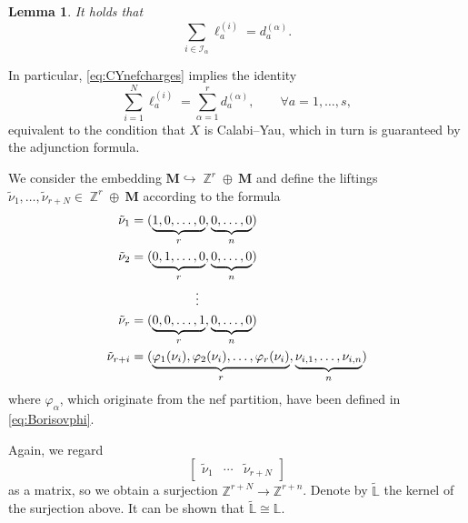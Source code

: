 \documentclass[12pt,a4paper,oneside]{amsart}
\numberwithin{equation}{section}
\newtheorem{lem}[thm]{Lemma}
\theoremstyle{definition}
\theoremstyle{remark}
\DeclareMathOperator{\Z}{\mathbb{Z}}
\begin{document}
\begin{lem}It holds that 
\begin{equation}
\label{eq:CYnefcharges}
	\sum_{i \in \mathcal{I}_{\alpha}} \ell_a ^{(i)} = d_a ^{(\alpha)} .
\end{equation}
\end{lem}
In particular, \eqref{eq:CYnefcharges} implies the identity 
\begin{equation*}
	\sum_{i=1}^{N} \ell_a ^{(i)} = \sum_{\alpha=1}^{r} d_a ^{(\alpha)} , \qquad \forall a=1, \dots, s , 
\end{equation*}
equivalent to the condition that $X$ is Calabi--Yau, which in turn is guaranteed by the adjunction formula.\par
We consider the embedding $\mathbf{M} \hookrightarrow \Z^{r} \oplus~\mathbf{M} $ and 
define the liftings \(\tilde{\nu}_{1},\ldots,\tilde{\nu}_{r+N}
\in \Z^{r} \oplus~\mathbf{M}\) according to the formula
\begin{equation}
\begin{aligned}
	\tilde{\nu}_1 &= (\underbrace{1, 0, \dots, 0}_{r} , \underbrace{0, \dots, 0}_{n}) \\
	\tilde{\nu}_2 &= (\underbrace{0, 1 ,\dots, 0}_{r} ,\underbrace{0, \dots, 0}_{n}) \\
	& \hspace{1.8cm}\vdots \\
	\tilde{\nu}_{r} &= (\underbrace{0, 0, \dots, 1}_{r} ,\underbrace{0, \dots, 0}_{n}) \\
	\tilde{\nu}_{r+i} &= (\underbrace{ \varphi_1 (\nu_i), \varphi_2 (\nu_i), \dots, \varphi_r (\nu_i)}_{r} ,\underbrace{ \nu_{i,1}, \dots, \nu_{i,n}}_{n})
\end{aligned}
\label{eq:tildenuI}
\end{equation}
where $\varphi_{\alpha}$, which originate from the nef partition, have been defined in \eqref{eq:Borisovphi}.\par

Again, we regard
\begin{equation}\label{eq:tildenutildeL}
    \begin{bmatrix}
        \tilde{\nu}_{1} & \cdots & \tilde{\nu}_{r+N}
    \end{bmatrix}
\end{equation}
as a matrix, so we obtain a surjection 
\(\mathbb{Z}^{r+N}\to\mathbb{Z}^{r+n}\).
Denote by \(\widetilde{\mathbb{L}}\) the kernel of the surjection above.
It can be shown that \(\widetilde{\mathbb{L}}\cong\mathbb{L}\).
\end{document}

